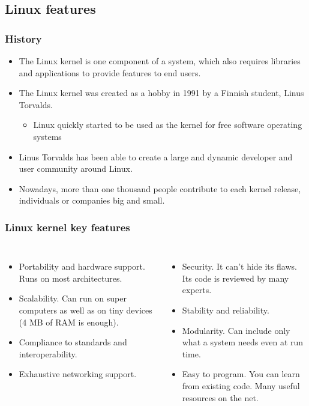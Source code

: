 \subsection{Linux features}

\begin{frame}
  \frametitle{History}
  \begin{itemize}
  \item The Linux kernel is one component of a system, which also
    requires libraries and applications to provide features to end
    users.
  \item The Linux kernel was created as a hobby in 1991 by a Finnish
    student, Linus Torvalds.
    \begin{itemize}
    \item Linux quickly started to be used as the kernel for free
      software operating systems
    \end{itemize}
  \item Linus Torvalds has been able to create a large and dynamic
    developer and user community around Linux.
  \item Nowadays, more than one thousand people contribute to each kernel
    release, individuals or companies big and small.
  \end{itemize}
\end{frame}

\begin{frame}
  \frametitle{Linux kernel key features}
  \begin{columns}
    \begin{itemize}
    \item Portability and hardware support. Runs on most
      architectures.
    \item Scalability. Can run on super computers as well as on tiny
      devices (4 MB of RAM is enough).
    \item Compliance to standards and interoperability.
    \item Exhaustive networking support.
    \end{itemize}
    \begin{itemize}
    \item Security. It can't hide its flaws. Its code is reviewed by
      many experts.
    \item Stability and reliability.
    \item Modularity. Can include only what a system needs even at run
      time.
    \item Easy to program. You can learn from existing code. Many
      useful resources on the net.
    \end{itemize}
  \end{columns}
\end{frame}

